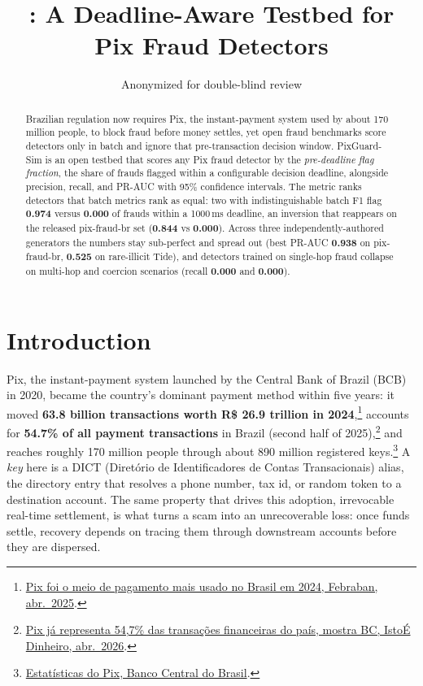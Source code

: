 \documentclass[12pt]{article}
\title{\sysname: A Deadline-Aware Testbed for Pix Fraud Detectors}
\author{Anonymized for double-blind review\inst{1}}
\newcommand{\sysname}{PixGuard-Sim\xspace}
\newcommand{\rfPre}{0.974}        %
\newcommand{\gbPreThousand}{0.000} %
\newcommand{\eCoerc}{0.000}
\newcommand{\eMed}{0.000}
\newcommand{\PfbXgbPRAUC}{0.938}   %
\newcommand{\PfbXgbPre}{0.844}
\newcommand{\PfbGbPre}{0.000}
\newcommand{\TideHiXgbPRAUC}{0.525} %
\begin{document}
\maketitle

\begin{abstract}
Brazilian regulation now requires Pix, the instant-payment system used by about
170 million people, to block fraud before money settles, yet open fraud
benchmarks score detectors only in batch and ignore that pre-transaction
decision window. \sysname{} is an open testbed that scores any Pix fraud
detector by the \emph{pre-deadline flag fraction}, the share of frauds flagged
within a configurable decision deadline, alongside precision, recall, and
PR-AUC with 95\% confidence intervals. The metric ranks detectors that batch
metrics rank as equal: two with indistinguishable batch F1 flag
\textbf{\rfPre} versus \textbf{\gbPreThousand} of frauds within a 1000\,ms
deadline, an inversion that reappears on the released pix-fraud-br set
(\textbf{\PfbXgbPre} vs \textbf{\PfbGbPre}). Across three
independently-authored generators the numbers stay sub-perfect and spread out
(best PR-AUC \textbf{\PfbXgbPRAUC} on pix-fraud-br, \textbf{\TideHiXgbPRAUC} on
rare-illicit Tide), and detectors trained on single-hop fraud collapse on
multi-hop and coercion scenarios (recall \textbf{\eCoerc} and \textbf{\eMed}).
\end{abstract}

\section{Introduction}

Pix, the instant-payment system launched by the Central Bank of Brazil (BCB) in
2020, became the country's dominant payment method within five years: it moved
\textbf{63.8 billion transactions worth R\$ 26.9 trillion in
2024},\footnote{\href{https://portal.febraban.org.br/noticia/4290/pt-br/}{Pix foi o meio de pagamento mais usado no Brasil em 2024, Febraban, abr.\ 2025}.}
accounts for \textbf{54.7\% of all payment transactions} in Brazil (second half
of 2025),\footnote{\href{https://istoedinheiro.com.br/pix-ja-representa-547-das-transacoes-financeiras-do-pais-mostra-bc}{Pix j\'a representa 54,7\% das transa\c{c}\~oes financeiras do pa\'is, mostra BC, IstoÉ Dinheiro, abr.\ 2026}.}
and reaches roughly 170 million people through about 890 million registered
keys.\footnote{\href{https://www.bcb.gov.br/estabilidadefinanceira/estatisticaspix}{Estat\'isticas do Pix, Banco Central do Brasil}.}
A \emph{key} here is a DICT (Diret\'orio de Identificadores de Contas
Transacionais) alias, the directory entry that resolves a phone number, tax id,
or random token to a destination account. The same property that drives this
adoption, irrevocable real-time settlement, is what turns a scam into an
unrecoverable loss: once funds settle, recovery depends on tracing them through
downstream accounts before they are dispersed.
\end{document}
